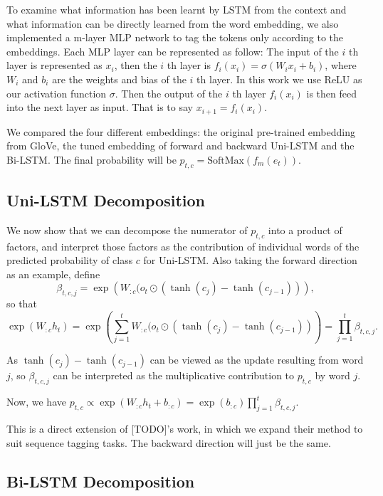 \documentclass{article}
\begin{document}
To examine what information has been learnt by LSTM from the context and what information can be directly learned from the word embedding, we also implemented a m-layer MLP network to tag the tokens only according to the embeddings. Each MLP layer can be represented as follow:
The input of the $i$ th layer is represented as $x_i$, then the $i$ th layer is $f_i(x_i) = \sigma(W_i x_i + b_i)$, where $W_i$ and $b_i$ are the weights and bias of the $i$ th layer. In this work we use ReLU as our activation function $\sigma$. Then the output of the $i$ th layer $f_i(x_i)$ is then feed into the next layer as input. That is to say $x_{i+1} = f_i(x_i)$. 

We compared the four different embeddings: the original pre-trained embedding from GloVe, the tuned embedding of forward and backward Uni-LSTM and the Bi-LSTM. The final probability will be $p_{t, c} = \text{SoftMax}(f_m(e_t))$.%

\subsection{Uni-LSTM Decomposition}
\label{uni-lstm-decom}

We now show that we can decompose the numerator of $p_{t, c}$ into a product of factors, and interpret those factors as the contribution of individual words of the predicted probability of class $c$ for Uni-LSTM. Also taking the forward direction as an example, define 
\begin{equation}\label{eq:uni-beta} 
\beta_{t, c, j} = \exp\left(W_{:c} (o_t \odot (\tanh(c_j)- \tanh(c_{j-1}))\right),
\end{equation}
so that 
\[\exp( W_{:c} h_t) = \exp\left(\sum_{j=1}^t W_{:c} (o_t \odot (\tanh(c_j) - \tanh(c_{j-1}))\right) = \prod_{j=1}^t \beta_{t, c, j}.\]

As $\tanh(c_j) - \tanh(c_{j-1})$ can be viewed as the update resulting from word $j$, so $\beta_{t, c, j}$ can be interpreted as the multiplicative contribution to $p_{t, c}$ by word $j$. 

Now, we have  $p_{t, c} \propto \exp( W_{:c} h_t + b_{:c}) = \exp(b_{:c})\prod_{j=1}^t \beta_{t, c, j}.$

This is a direct extension of [TODO]'s work, in which we expand their method to suit sequence tagging tasks.
The backward direction will just be the same.

\subsection{Bi-LSTM Decomposition}
\label{bi-lstm-decom}
\end{document}
